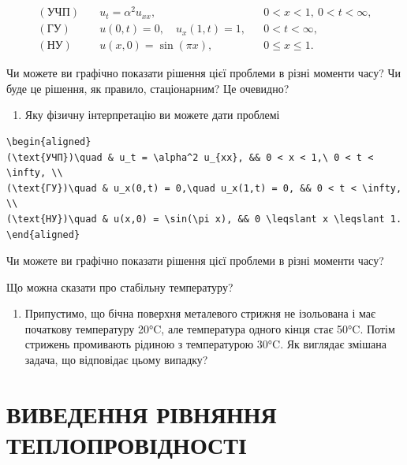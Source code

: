 \documentclass[
  ukrainian,
]{article}
\providecommand{\tightlist}{%
  \setlength{\itemsep}{0pt}\setlength{\parskip}{0pt}}
\begin{document}
\[
\begin{aligned}
(\text{УЧП})\quad & u_t = \alpha^2 u_{xx}, && 0 < x < 1,\ 0 < t < \infty, \\
(\text{ГУ})\quad & u(0,t) = 0,\quad u_x(1,t) = 1, && 0 < t < \infty, \\
(\text{НУ})\quad & u(x,0) = \sin(\pi x), && 0 \leqslant x \leqslant 1.
\end{aligned}
\]

Чи можете ви графічно показати рішення цієї проблеми в різні моменти
часу? Чи буде це рішення, як правило, стаціонарним? Це очевидно?

\begin{enumerate}
\def\labelenumi{\arabic{enumi}.}
\setcounter{enumi}{2}
\tightlist
\item
  Яку фізичну інтерпретацію ви можете дати проблемі
\end{enumerate}

\begin{verbatim}
\begin{aligned}
(\text{УЧП})\quad & u_t = \alpha^2 u_{xx}, && 0 < x < 1,\ 0 < t < \infty, \\
(\text{ГУ})\quad & u_x(0,t) = 0,\quad u_x(1,t) = 0, && 0 < t < \infty, \\
(\text{НУ})\quad & u(x,0) = \sin(\pi x), && 0 \leqslant x \leqslant 1.
\end{aligned}
\end{verbatim}

Чи можете ви графічно показати рішення цієї проблеми в різні моменти
часу?

Що можна сказати про стабільну температуру?

\begin{enumerate}
\def\labelenumi{\arabic{enumi}.}
\setcounter{enumi}{3}
\tightlist
\item
  Припустимо, що бічна поверхня металевого стрижня не ізольована і має
  початкову температуру 20°C, але температура одного кінця стає 50°C.
  Потім стрижень промивають рідиною з температурою 30°C. Як виглядає
  змішана задача, що відповідає цьому випадку?
\end{enumerate}

\section{ВИВЕДЕННЯ РІВНЯННЯ
ТЕПЛОПРОВІДНОСТІ}\label{ux432ux438ux432ux435ux434ux435ux43dux43dux44f-ux440ux456ux432ux43dux44fux43dux43dux44f-ux442ux435ux43fux43bux43eux43fux440ux43eux432ux456ux434ux43dux43eux441ux442ux456}
\end{document}
